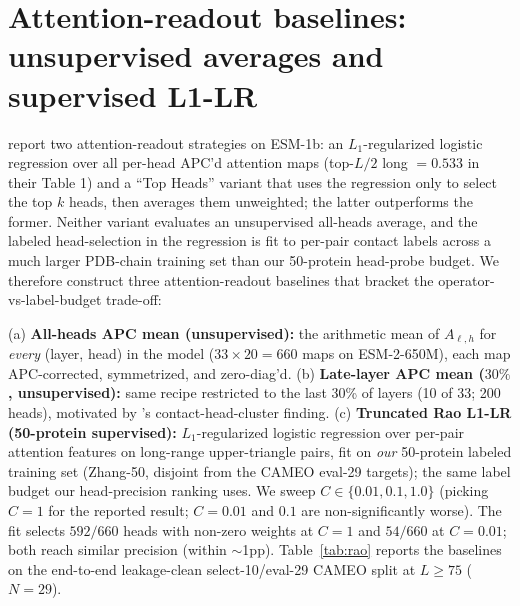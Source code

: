 \documentclass{article}
\begin{document}
\section{Attention-readout baselines: unsupervised averages and supervised L1-LR}
\label{app:rao-baseline}

\citet{rao2021transformerplm} report two attention-readout strategies
on ESM-1b: an $L_1$-regularized logistic regression over all per-head
APC'd attention maps (top-$L/2$ long $= 0.533$ in their Table 1) and a
``Top Heads'' variant that uses the regression only to select the top
$k$ heads, then averages them unweighted; the latter outperforms the
former. Neither variant evaluates an unsupervised all-heads average,
and the labeled head-selection in the regression is fit to per-pair
contact labels across a much larger PDB-chain training set than our
50-protein head-probe budget. We therefore construct three
attention-readout baselines that bracket the operator-vs-label-budget
trade-off:

(a) \textbf{All-heads APC mean (unsupervised):} the arithmetic mean of
$A_{\ell, h}$ for \emph{every} (layer, head) in the model ($33 \times
20 = 660$ maps on ESM-2-650M), each map APC-corrected, symmetrized,
and zero-diag'd. (b) \textbf{Late-layer APC mean ($30\%$,
unsupervised):} same recipe restricted to the last 30\% of layers
(10 of 33; 200 heads), motivated by
\citeauthor{bhattacharya2021attention}'s contact-head-cluster
finding. (c) \textbf{Truncated Rao L1-LR (50-protein supervised):}
$L_1$-regularized logistic regression over per-pair attention features
on long-range upper-triangle pairs, fit on \emph{our} 50-protein
labeled training set (Zhang-50, disjoint from the CAMEO eval-29 targets);
the same label budget our
head-precision ranking uses. We sweep $C \in \{0.01, 0.1, 1.0\}$
(picking $C{=}1$ for the reported result; $C{=}0.01$ and $0.1$ are
non-significantly worse). The fit selects $592/660$ heads with
non-zero weights at $C{=}1$ and $54/660$ at $C{=}0.01$; both reach
similar precision (within $\sim$1pp). Table~\ref{tab:rao} reports
the baselines on the end-to-end leakage-clean
select-10/eval-29 CAMEO split at $L \geq 75$ ($N{=}29$).
\end{document}
